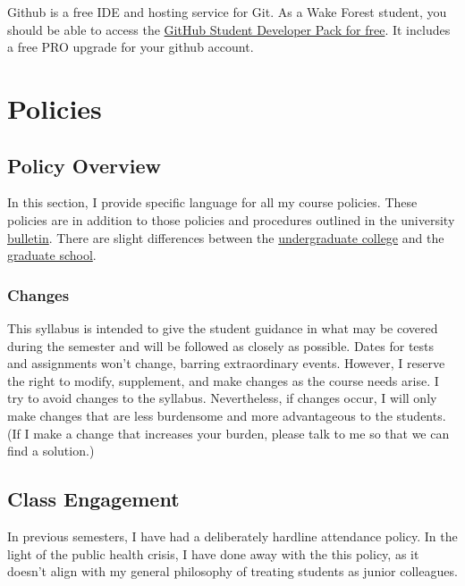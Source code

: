 Github is a free IDE and hosting service for Git. As a Wake Forest student, you should be able to access the \href{https://education.github.com/benefits?type=student}{GitHub Student Developer Pack for free}. It includes a free PRO upgrade for your github account.

\hypertarget{part-policies}{%
\part*{Policies}\label{part-policies}}


\hypertarget{policy-overview}{%
\chapter{Policy Overview}\label{policy-overview}}

In this section, I provide specific language for all my course policies. These policies are in addition to those policies and procedures outlined in the university \href{https://bulletin.wfu.edu}{bulletin}. There are slight differences between the \href{https://bulletin.wfu.edu/undergraduate/}{undergraduate college} and the \href{https://bulletin.wfu.edu/graduate/}{graduate school}.

\hypertarget{changes}{%
\section{Changes}\label{changes}}

This syllabus is intended to give the student guidance in what may be covered during the semester and will be followed as closely as possible.
Dates for tests and assignments won't change, barring extraordinary events.
However, I reserve the right to modify, supplement, and make changes as the course needs arise.
I try to avoid changes to the syllabus.
Nevertheless, if changes occur, I will only make changes that are less burdensome and more advantageous to the students.
(If I make a change that increases your burden, please talk to me so that we can find a solution.)

\hypertarget{class-engagement}{%
\chapter{Class Engagement}\label{class-engagement}}

In previous semesters, I have had a deliberately hardline attendance policy.
In the light of the public health crisis, I have done away with the this policy, as it doesn't align with my general philosophy of treating students as junior colleagues.

